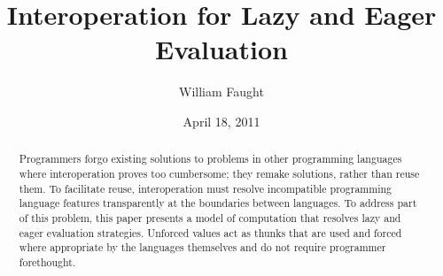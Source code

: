 \documentclass[12pt]{article}
\begin{document}
\title{Interoperation for Lazy and Eager Evaluation}
\author{William Faught}
\date{April 18, 2011}
\maketitle

\begin{abstract}
Programmers forgo existing solutions to problems in other programming languages where interoperation proves too cumbersome; they remake solutions, rather than reuse them. To facilitate reuse, interoperation must resolve incompatible programming language features transparently at the boundaries between languages. To address part of this problem, this paper presents a model of computation that resolves lazy and eager evaluation strategies. Unforced values act as thunks that are used and forced where appropriate by the languages themselves and do not require programmer forethought.
\end{abstract}






\clearpage

\nocite{*}


\end{document}
